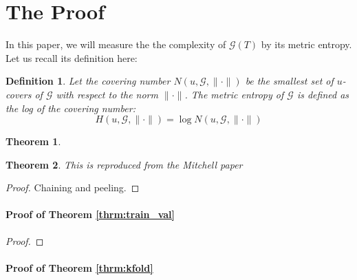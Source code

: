 \documentclass[12pt]{article}
\newtheorem{theorem}{Theorem}
\newtheorem{definition}{Definition}
\begin{document}
\section{The Proof} \label{sec:proofs}

In this paper, we will measure the the complexity of $\mathcal{G}(T)$ by its metric entropy. Let us recall its definition here:

\begin{definition}
Let the covering number $N(u, \mathcal{G}, \| \cdot \|)$ be the smallest set of $u$-covers of $\mathcal{G}$ with respect to the norm $\| \cdot \|$. The metric entropy of $\mathcal{G}$ is defined as the log of the covering number:
\begin{equation}
H (u, \mathcal{G}, \| \cdot \| ) = \log N(u, \mathcal{G}, \| \cdot \|)
\end{equation}
\end{definition}

\begin{theorem}
\label{thrm:train_val_complicated}
\end{theorem}

\begin{theorem}
	\label{thrm:k_fold_complicated}
	This is reproduced from the Mitchell paper
\end{theorem}

\begin{proof}
Chaining and peeling.
\end{proof}


\paragraph{Proof of Theorem \ref{thrm:train_val}}

\begin{proof}

\end{proof}

\paragraph{Proof of Theorem \ref{thrm:kfold}}
\end{document}

